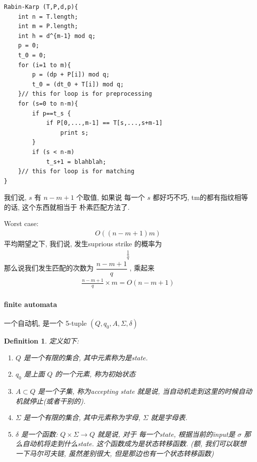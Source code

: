\documentclass[a4paper, 10pt]{ctexart} %
\newtheorem{definition}{Definition}
\begin{document}
\begin{verbatim}
Rabin-Karp (T,P,d,p){
    int n = T.length;
    int m = P.length;
    int h = d^{m-1} mod q;
    p = 0;
    t_0 = 0;
    for (i=1 to m){ 
        p = (dp + P[i]) mod q;
        t_0 = (dt_0 + T[i]) mod q;
    }// this for loop is for preprocessing
    for (s=0 to n-m){ 
        if p==t_s {
            if P[0,...,m-1] == T[s,...,s+m-1]
                print s;
        }
        if (s < n-m)
            t_s+1 = blahblah;
    }// this for loop is for matching
}
\end{verbatim}

我们说, $s$ 有 $n-m+1$ 个取值, 
如果说 每一个 $s$ 都好巧不巧, 
tm的都有指纹相等的话, 这个东西就相当于
朴素匹配方法了. 

Worst case: 
\begin{align*}
    O \left( \left( n - m  + 1 \right) m\right)
\end{align*}
平均期望之下, 我们说, 发生suprious strike 的概率为 
\begin{align*}
    \frac{1}{q}
\end{align*}
那么说我们发生匹配的次数为 $\dfrac{n - m  + 1}{q}$ , 
乘起来
\begin{align*}
    \frac{n  - m+ 1 }{q} \times m = O\left( n - m + 1\right)
\end{align*}
\paragraph{finite automata} %
一个自动机, 是一个 5-tuple $ \left( Q ,q _{0} , A, \Sigma , \delta\right) $

\begin{definition}
定义如下:
\begin{enumerate}
    \item 
$ Q $ 是一个有限的集合, 其中元素称为是state.
    \item
$ q_{0} $ 是上面 $ Q $ 的一个元素, 称为初始状态
    \item 
$ A \subset Q $ 是一个子集, 称为accepting state 就是说, 当自动机走到这里的时候自动机就停止(或者干别的).
    \item 
$ \Sigma $ 是一个有限的集合, 其中元素称为字母, $ \Sigma $ 就是字母表.
    \item
$ \delta $ 是一个函数: $ Q \times \Sigma \to Q $ 
就是说, 对于
每一个state, 根据当前的input是 $ \sigma $ 
那么自动机将走到什么state. 这个函数成为是状态转移函数. 
(额, 我们可以联想一下马尔可夫链, 虽然差别很大, 但是那边也有一个状态转移函数)
\end{enumerate}
\end{definition}
\end{document}
